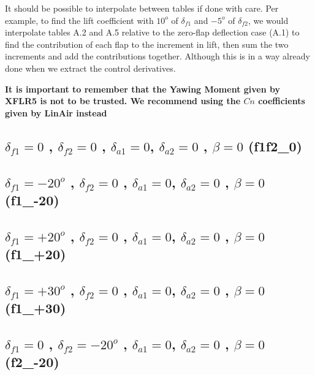 \documentclass[titlepage,10pt]{article}
\begin{document}
It should be possible to interpolate between tables if done with care. Per example, to find the lift coefficient with $10^o$ of $\delta_{f1}$ and $-5^o$ of $\delta_{f2}$, we would interpolate tables A.2 and A.5 relative to the zero-flap deflection case (A.1) to find the contribution of each flap to the increment in lift, then sum the two increments and add the contributions together. Although this is in a way already done when we extract the control derivatives.

\textbf{It is important to remember that the Yawing Moment given by XFLR5 is not to be trusted. We recommend using the $Cn$ coefficients given by LinAir instead}

\subsection{$\delta_{f1} = 0$ , $\delta_{f2} = 0$ , $\delta_{a1} = 0$, $\delta_{a2} = 0$ , $\beta=0$ (f1f2\_0)}
\begin{tiny}\end{tiny}

\subsection{$\delta_{f1} = -20^o$ , $\delta_{f2} = 0$ , $\delta_{a1} = 0$, $\delta_{a2} = 0$ , $\beta=0$ (f1\_-20)}
\begin{tiny}\end{tiny}

\subsection{$\delta_{f1} = +20^o$ , $\delta_{f2} = 0$ , $\delta_{a1} = 0$, $\delta_{a2} = 0$ , $\beta=0$ (f1\_+20)}
\begin{tiny}\end{tiny}

\subsection{$\delta_{f1} = +30^o$ , $\delta_{f2} = 0$ , $\delta_{a1} = 0$, $\delta_{a2} = 0$ , $\beta=0$ (f1\_+30)}
\begin{tiny}\end{tiny}

\subsection{$\delta_{f1} = 0$ , $\delta_{f2} = -20^o$ , $\delta_{a1} = 0$, $\delta_{a2} = 0$ , $\beta=0$ (f2\_-20)}
\begin{tiny}\end{tiny}
\end{document}
